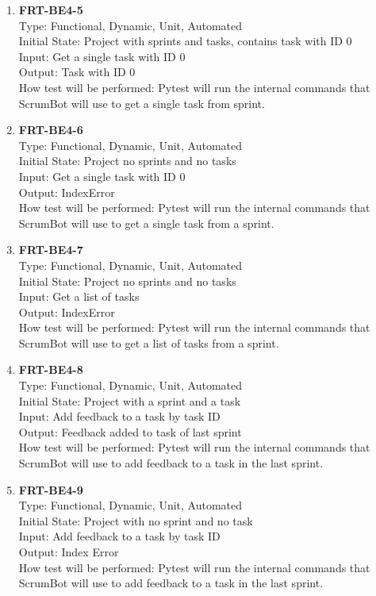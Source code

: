 \documentclass[12pt, titlepage]{article}
\begin{document}
\begin{enumerate}
    \item{\textbf{FRT-BE4-5}}\\
    Type: Functional, Dynamic, Unit, Automated\\
    Initial State: Project with sprints and tasks, contains task with ID 0 \\
    Input: Get a single task with ID 0\\
    Output: Task with ID 0\\
    How test will be performed: Pytest will run the internal commands that ScrumBot will use to get a single task from sprint.
    
    \item{\textbf{FRT-BE4-6}}\\
    Type: Functional, Dynamic, Unit, Automated\\
    Initial State: Project no sprints and no tasks\\
    Input: Get a single task with ID 0\\
    Output: IndexError\\
    How test will be performed: Pytest will run the internal commands that ScrumBot will use to get a single task from a sprint.
    
    \item{\textbf{FRT-BE4-7}}\\
    Type: Functional, Dynamic, Unit, Automated\\
    Initial State: Project no sprints and no tasks\\
    Input: Get a list of tasks\\
    Output: IndexError\\
    How test will be performed: Pytest will run the internal commands that ScrumBot will use to get a list of tasks from a sprint.
    
    \item{\textbf{FRT-BE4-8}}\\
    Type: Functional, Dynamic, Unit, Automated\\
    Initial State: Project with a sprint and a task\\
    Input: Add feedback to a task by task ID\\
    Output: Feedback added to task of last sprint\\
    How test will be performed: Pytest will run the internal commands that ScrumBot will use to add feedback to a task in the last sprint.
 
     
    \item{\textbf{FRT-BE4-9}}\\
    Type: Functional, Dynamic, Unit, Automated\\
    Initial State: Project with no sprint and no task\\
    Input: Add feedback to a task by task ID\\
    Output: Index Error\\
    How test will be performed: Pytest will run the internal commands that ScrumBot will use to add feedback to a task in the last sprint.
    

\end{enumerate}
\end{document}
